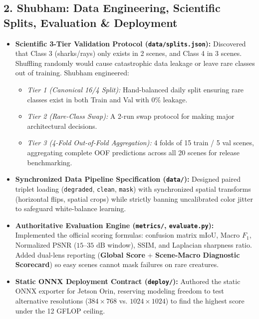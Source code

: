\documentclass[10pt,a4paper]{article}
\begin{document}
\subsection{2. Shubham: Data Engineering, Scientific Splits, Evaluation \& Deployment}
\begin{itemize}[noitemsep,topsep=1pt]
    \item \textbf{Scientific 3-Tier Validation Protocol (\texttt{data/splits.json}):} Discovered that Class 3 (sharks/rays) only exists in 2 scenes, and Class 4 in 3 scenes. Shuffling randomly would cause catastrophic data leakage or leave rare classes out of training. Shubham engineered:
    \begin{itemize}[noitemsep]
        \item \textit{Tier 1 (Canonical 16/4 Split):} Hand-balanced daily split ensuring rare classes exist in both Train and Val with 0\% leakage.
        \item \textit{Tier 2 (Rare-Class Swap):} A 2-run swap protocol for making major architectural decisions.
        \item \textit{Tier 3 (4-Fold Out-of-Fold Aggregation):} 4 folds of 15 train / 5 val scenes, aggregating complete OOF predictions across all 20 scenes for release benchmarking.
    \end{itemize}
    \item \textbf{Synchronized Data Pipeline Specification (\texttt{data/}):} Designed paired triplet loading (\texttt{degraded}, \texttt{clean}, \texttt{mask}) with synchronized spatial transforms (horizontal flips, spatial crops) while strictly banning uncalibrated color jitter to safeguard white-balance learning.
    \item \textbf{Authoritative Evaluation Engine (\texttt{metrics/}, \texttt{evaluate.py}):} Implemented the official scoring formulas: confusion matrix mIoU, Macro $F_1$, Normalized PSNR ($15\text{--}35\text{ dB}$ window), SSIM, and Laplacian sharpness ratio. Added dual-lens reporting (\textbf{Global Score} + \textbf{Scene-Macro Diagnostic Scorecard}) so easy scenes cannot mask failures on rare creatures.
    \item \textbf{Static ONNX Deployment Contract (\texttt{deploy/}):} Authored the static ONNX exporter for Jetson Orin, reserving modeling freedom to test alternative resolutions ($384 \times 768$ vs. $1024 \times 1024$) to find the highest score under the 12 GFLOP ceiling.
\end{itemize}
\end{document}
